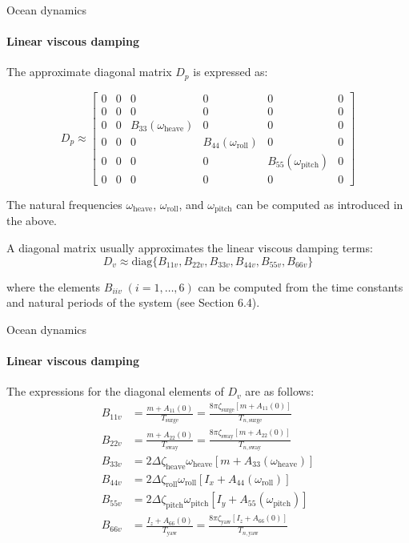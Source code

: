 \begin{frame}{Ocean dynamics}
	\framesubtitle{Linear viscous damping}
	The approximate diagonal matrix $D_p$ is expressed as:
	
	\begin{equation}
		D_p \approx 
		\begin{bmatrix}
			0 & 0 & 0 & 0 & 0 & 0 \\
			0 & 0 & 0 & 0 & 0 & 0 \\
			0 & 0 & B_{33}(\omega_\text{heave}) & 0 & 0 & 0 \\
			0 & 0 & 0 & B_{44}(\omega_\text{roll}) & 0 & 0 \\
			0 & 0 & 0 & 0 & B_{55}(\omega_\text{pitch}) & 0 \\
			0 & 0 & 0 & 0 & 0 & 0
		\end{bmatrix} 
	\end{equation}
	
	The natural frequencies $\omega_\text{heave}$, $\omega_\text{roll}$, and $\omega_\text{pitch}$ can be computed as introduced in the above.
	
	A diagonal matrix usually approximates the linear viscous damping terms:
	\begin{equation}
		D_v \approx \text{diag}\{B_{11v}, B_{22v}, B_{33v}, B_{44v}, B_{55v}, B_{66v}\}
	\end{equation}
	
	where the elements $B_{iiv} \; (i = 1, \ldots, 6)$ can be computed from the time constants and natural periods of the system (see Section 6.4).
\end{frame}







\begin{frame}{Ocean dynamics}
	\framesubtitle{Linear viscous damping}
	The expressions for the diagonal elements of $D_v$ are as follows:
	\begin{align}
		B_{11v} &= \frac{m + A_{11}(0)}{T_\text{surge}} = \frac{8\pi \zeta_\text{surge}[m + A_{11}(0)]}{T_{n,\text{surge}}} \\
		B_{22v} &= \frac{m + A_{22}(0)}{T_\text{sway}} = \frac{8\pi \zeta_\text{sway}[m + A_{22}(0)]}{T_{n,\text{sway}}} \\
		B_{33v} &= 2\Delta \zeta_\text{heave} \omega_\text{heave} [m + A_{33}(\omega_\text{heave})] \\
		B_{44v} &= 2\Delta \zeta_\text{roll} \omega_\text{roll} [I_x + A_{44}(\omega_\text{roll})] \\
		B_{55v} &= 2\Delta \zeta_\text{pitch} \omega_\text{pitch} [I_y + A_{55}(\omega_\text{pitch})] \\
		B_{66v} &= \frac{I_z + A_{66}(0)}{T_\text{yaw}} = \frac{8\pi \zeta_\text{yaw}[I_z + A_{66}(0)]}{T_{n,\text{yaw}}}
	\end{align}
\end{frame}




